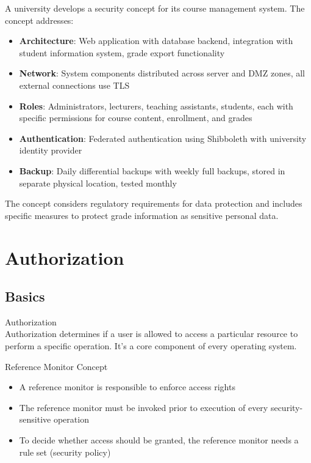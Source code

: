 \begin{example}
A university develops a security concept for its course management system. The concept addresses:

\begin{itemize}
    \item \textbf{Architecture}: Web application with database backend, integration with student information system, grade export functionality
    \item \textbf{Network}: System components distributed across server and DMZ zones, all external connections use TLS
    \item \textbf{Roles}: Administrators, lecturers, teaching assistants, students, each with specific permissions for course content, enrollment, and grades
    \item \textbf{Authentication}: Federated authentication using Shibboleth with university identity provider
    \item \textbf{Backup}: Daily differential backups with weekly full backups, stored in separate physical location, tested monthly
\end{itemize}

The concept considers regulatory requirements for data protection and includes specific measures to protect grade information as sensitive personal data.
\end{example}

\section{Authorization}

\subsection{Basics}

\begin{definition}{Authorization}\\
    Authorization determines if a user is allowed to access a particular resource to perform a specific operation. It's a core component of every operating system.
\end{definition}

\begin{concept}{Reference Monitor Concept}\\
    \begin{itemize}
        \item A reference monitor is responsible to enforce access rights
        \item The reference monitor must be invoked prior to execution of every security-sensitive operation
        \item To decide whether access should be granted, the reference monitor needs a rule set (security policy)
    \end{itemize}
    
\end{concept}

